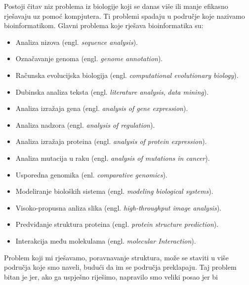 \documentclass[times, utf8, zavrsni]{fer}
\begin{document}
Postoji čitav niz problema iz biologije koji se danas više ili manje efikasno
rješavaju uz pomoć kompjutera. Ti problemi spadaju u područje koje nazivamo
bioinformatikom. Glavni problema koje rješava bioinformatika su:

\begin{itemize}
\item
Analiza nizova (engl. \textit{sequence analysis}). 

\item
Označavanje genoma (engl. \textit{genome annotation}).

\item
Računska evolucijska biologija (engl. \textit{computational
evolutionary biology}).

\item
Dubinska analiza teksta (engl. \textit{literature analysis}, 
\textit{data mining}).

\item
Analiza izražaja gena (engl. \textit{analysis of gene expression}).

\item
Analiza nadzora (engl. \textit{analysis of regulation}).

\item
Analiza izražaja proteina (engl. \textit{analysis of protein
expression}).

\item
Analiza mutacija u raku (engl. \textit{analysis of mutations in cancer}).

\item
Usporedna genomika (enl. \textit{comparative genomics}).

\item
Modeliranje bioloških sistema (engl. \textit{modeling biological
systems}).

\item
Visoko-propusna anliza slika (engl. \textit{high-throughput
image analysis}).

\item
Predviđanje struktura proteina (engl. \textit{protein structure prediction}).

\item 
Interakcija među molekulama (engl. \textit{molecular Interaction}).
\end{itemize}

Problem koji mi rješavamo, poravnavanje struktura, može se staviti u više 
područja koje smo naveli, budući da im se područja preklapaju. Taj problem
bitan je jer, ako ga uspješno riješimo, napravilo smo veliki posao jer
bi 
\end{document}
